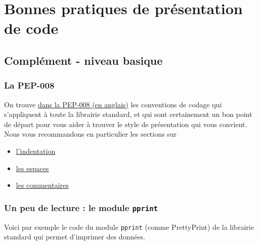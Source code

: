     \hypertarget{bonnes-pratiques-de-pruxe9sentation-de-code}{%
\section{Bonnes pratiques de présentation de
code}\label{bonnes-pratiques-de-pruxe9sentation-de-code}}

    \hypertarget{compluxe9ment---niveau-basique}{%
\subsection{Complément - niveau
basique}\label{compluxe9ment---niveau-basique}}

    \hypertarget{la-pep-008}{%
\subsubsection{La PEP-008}\label{la-pep-008}}

    On trouve \href{http://legacy.python.org/dev/peps/pep-0008/}{dans la
PEP-008 (en anglais)} les conventions de codage qui s'appliquent à toute
la librairie standard, et qui sont certainement un bon point de départ
pour vous aider à trouver le style de présentation qui vous convient.\\

Nous vous recommandons en particulier les sections sur

\begin{itemize}
	\item 
	\href{http://legacy.python.org/dev/peps/pep-0008/\#code-lay-out}{l'indentation}
	\item
	\href{http://legacy.python.org/dev/peps/pep-0008/\#whitespace-in-expressions-and-statements}{les
	espaces}
	\item
	\href{http://legacy.python.org/dev/peps/pep-0008/\#comments}{les
	commentaires}
\end{itemize}

    \hypertarget{un-peu-de-lecture-le-module-pprint}{%
\subsubsection{\texorpdfstring{Un peu de lecture : le module
\texttt{pprint}}{Un peu de lecture : le module pprint}}\label{un-peu-de-lecture-le-module-pprint}}

    Voici par exemple le code du module \texttt{pprint} (comme PrettyPrint)
de la librairie standard qui permet d'imprimer des données.\\

